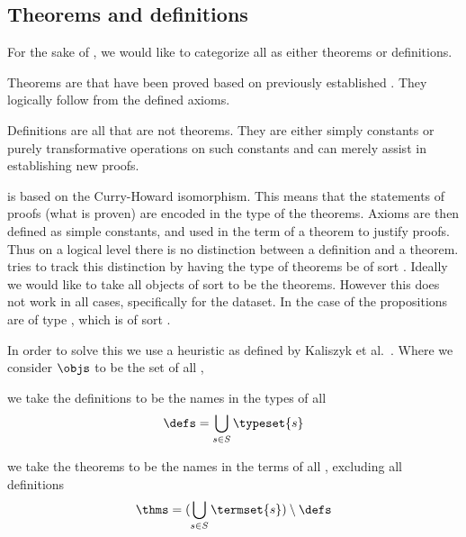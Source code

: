 \subsection{Theorems and definitions}
\label{section:thmsdefs}

For the sake of \premiseselection, we would like to categorize all \coqobjs as either theorems or definitions.
\begin{definition}[theorem]
    Theorems are \coqobjs that have been proved based on previously established \coqobjs.
    They logically follow from the defined axioms.
\end{definition}

\begin{definition}[definition]
    Definitions are all \coqobjs that are not theorems.
    They are either simply constants or purely transformative operations on such constants
    and can merely assist in establishing new proofs.
\end{definition}

\coq is based on the Curry-Howard isomorphism.
This means that the statements of proofs (what is proven) are encoded in the type of the theorems.
Axioms are then defined as simple constants, and used in the term of a theorem to justify proofs.
Thus on a logical level there is no distinction between a definition and a theorem.
\coq tries to track this distinction by having the type of theorems be of sort \sortprop.
Ideally we would like to take all objects of sort \sortprop to be the theorems.
However this does not work in all cases, specifically for the \corn dataset.
In the case of \corn the propositions are of type \cprop, which is of sort \sorttype.

In order to solve this we use a heuristic as defined by Kaliszyk et al.\ \cite{kaliszyk2014machine}.
Where we consider $\objs$ to be the set of all \coqobjs,

\begin{definition}\label{def:defs}
  we take the definitions to be the names in the types of all \coqobjs
  \[ \defs = \bigcup_{s \in S} \typeset{s} \]
\end{definition}

\begin{definition}\label{def:thms}
  we take the theorems to be the names in the terms of all \coqobj, excluding all definitions
  \[ \thms = (\bigcup_{s \in S} \termset{s}) \setminus \defs \]
\end{definition}

